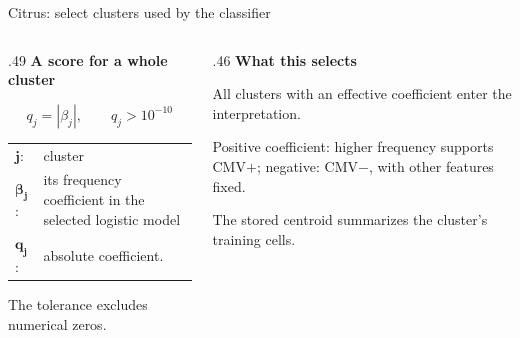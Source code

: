 \documentclass[aspectratio=169,10pt]{beamer}
\newcommand{\eyebrow}[1]{{\color{Teal}\bfseries #1}\par\smallskip}
\newcommand{\compactmath}{%
  \setlength{\abovedisplayskip}{4pt}\setlength{\belowdisplayskip}{4pt}%
  \setlength{\abovedisplayshortskip}{2pt}\setlength{\belowdisplayshortskip}{4pt}}
\begin{document}
\begin{frame}[t]{Citrus: select clusters used by the classifier}
  \relax
  {\centering
  \par}\smallskip
  \begin{columns}[T,onlytextwidth]
    \begin{column}{.49\textwidth}
      \eyebrow{A score for a whole cluster}
      \compactmath
      \[q_j=|\beta_j|,\qquad q_j>10^{-10}\]
      {\small\begin{tabular}{@{}l@{\quad}>{\raggedright\arraybackslash}p{.78\linewidth}@{}}
        $\boldsymbol{j}$: & cluster\\
        $\boldsymbol{\beta_j}$: & its frequency coefficient in the selected logistic model\\
        $\boldsymbol{q_j}$: & absolute coefficient.
      \end{tabular}}\par\smallskip
      \small The tolerance excludes numerical zeros.
    \end{column}
    \begin{column}{.46\textwidth}
      \eyebrow{What this selects}
      All clusters with an effective coefficient enter the interpretation.\par\medskip
      \small Positive coefficient: higher frequency supports CMV$+$; negative: CMV$-$, with other features fixed.\par\smallskip
      The stored centroid summarizes the cluster's training cells.
    \end{column}
  \end{columns}
\end{frame}
\end{document}
